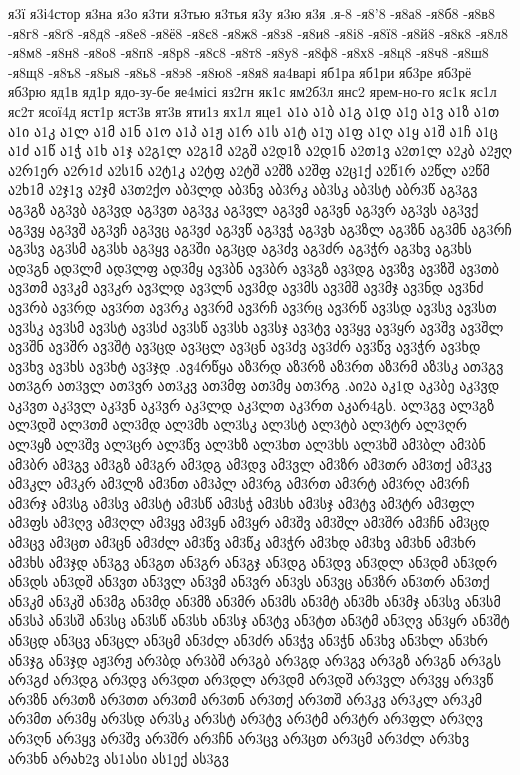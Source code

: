 {{я3ї
я3і4стор
я3на
я3о
я3ти
я3тью
я3тья
я3у
я3ю
я3я
.я-8
-я8'8
-я8а8
-я8б8
-я8в8
-я8г8
-я8ґ8
-я8д8
-я8е8
-я8ё8
-я8є8
-я8ж8
-я8з8
-я8и8
-я8і8
-я8ї8
-я8й8
-я8к8
-я8л8
-я8м8
-я8н8
-я8о8
-я8п8
-я8р8
-я8с8
-я8т8
-я8у8
-я8ф8
-я8х8
-я8ц8
-я8ч8
-я8ш8
-я8щ8
-я8ъ8
-я8ы8
-я8ь8
-я8э8
-я8ю8
-я8я8
яа4варі
яб1ра
яб1ри
яб3ре
яб3рё
яб3рю
яд1в
яд1р
ядо-зу-бе
яе4місі
яз2гн
як1с
ям2б3л
янс2
ярем-но-го
яс1к
яс1л
яс2т
ясої4д
яст1р
яст3в
ят3в
яти1з
ях1л
яце1
ა1ა
ა1ბ
ა1გ
ა1დ
ა1ე
ა1ვ
ა1ზ
ა1თ
ა1ი
ა1კ
ა1ლ
ა1მ
ა1ნ
ა1ო
ა1პ
ა1ჟ
ა1რ
ა1ს
ა1ტ
ა1უ
ა1ფ
ა1ღ
ა1ყ
ა1შ
ა1ჩ
ა1ც
ა1ძ
ა1წ
ა1ჭ
ა1ხ
ა1ჯ
ა2გ1ლ
ა2გ1მ
ა2გშ
ა2დ1ზ
ა2დ1ნ
ა2თ1ვ
ა2თ1ლ
ა2კბ
ა2ჟღ
ა2რ1ერ
ა2რ1ძ
ა2ს1ნ
ა2ტ1კ
ა2ტფ
ა2ტშ
ა2შზ
ა2შფ
ა2ც1ქ
ა2წ1რ
ა2წლ
ა2წმ
ა2ხ1მ
ა2ჯ1ვ
ა2ჯმ
ა3თ2ქო
აბ3ლდ
აბ3ნვ
აბ3რკ
აბ3სკ
აბ3სტ
აბრ3წ
აგ3გვ
აგ3გზ
აგ3ვბ
აგ3ვდ
აგ3ვთ
აგ3ვკ
აგ3ვლ
აგ3ვმ
აგ3ვნ
აგ3ვრ
აგ3ვს
აგ3ვქ
აგ3ვყ
აგ3ვშ
აგ3ვჩ
აგ3ვც
აგ3ვძ
აგ3ვწ
აგ3ვჭ
აგ3ვხ
აგ3ზლ
აგ3ზნ
აგ3მნ
აგ3რჩ
აგ3სვ
აგ3სმ
აგ3სხ
აგ3ყვ
აგ3ში
აგ3ცდ
აგ3ძვ
აგ3ძრ
აგ3ჭრ
აგ3ხვ
აგ3ხს
ად3გნ
ად3ლმ
ად3ლფ
ად3მყ
ავ3ბნ
ავ3ბრ
ავ3გზ
ავ3დგ
ავ3ზვ
ავ3ზშ
ავ3თბ
ავ3თმ
ავ3კმ
ავ3კრ
ავ3ლდ
ავ3ლნ
ავ3მდ
ავ3მს
ავ3მშ
ავ3მჯ
ავ3ნდ
ავ3ნძ
ავ3რბ
ავ3რდ
ავ3რთ
ავ3რკ
ავ3რმ
ავ3რჩ
ავ3რც
ავ3რწ
ავ3სდ
ავ3სვ
ავ3სთ
ავ3სკ
ავ3სმ
ავ3სტ
ავ3სძ
ავ3სწ
ავ3სხ
ავ3სჯ
ავ3ტვ
ავ3ყვ
ავ3ყრ
ავ3შვ
ავ3შლ
ავ3შნ
ავ3შრ
ავ3შტ
ავ3ცდ
ავ3ცლ
ავ3ცნ
ავ3ძვ
ავ3ძრ
ავ3წვ
ავ3ჭრ
ავ3ხდ
ავ3ხვ
ავ3ხს
ავ3ხტ
ავ3ჯდ
.ავ4რწყა
აზ3რდ
აზ3რზ
აზ3რთ
აზ3რმ
აზ3სკ
ათ3გვ
ათ3გრ
ათ3ვლ
ათ3ვრ
ათ3კვ
ათ3მფ
ათ3მყ
ათ3რგ
.აი2ა
აკ1დ
აკ3ბე
აკ3ვდ
აკ3ვთ
აკ3ვლ
აკ3ვნ
აკ3ვრ
აკ3ლდ
აკ3ლთ
აკ3რთ
აკარ4გს.
ალ3გვ
ალ3გზ
ალ3დშ
ალ3თმ
ალ3მდ
ალ3მხ
ალ3სკ
ალ3სტ
ალ3ტბ
ალ3ტრ
ალ3ღრ
ალ3ყზ
ალ3შვ
ალ3ცრ
ალ3წვ
ალ3ხზ
ალ3ხთ
ალ3ხს
ალ3ხშ
ამ3ბლ
ამ3ბნ
ამ3ბრ
ამ3გვ
ამ3გზ
ამ3გრ
ამ3დგ
ამ3დვ
ამ3ვლ
ამ3ზრ
ამ3თრ
ამ3თქ
ამ3კვ
ამ3კლ
ამ3კრ
ამ3ლზ
ამ3ნთ
ამ3პლ
ამ3რგ
ამ3რთ
ამ3რტ
ამ3რღ
ამ3რჩ
ამ3რჯ
ამ3სგ
ამ3სვ
ამ3სტ
ამ3სწ
ამ3სჭ
ამ3სხ
ამ3სჯ
ამ3ტვ
ამ3ტრ
ამ3ფლ
ამ3ფს
ამ3ღვ
ამ3ღლ
ამ3ყვ
ამ3ყნ
ამ3ყრ
ამ3შვ
ამ3შლ
ამ3შრ
ამ3ჩნ
ამ3ცდ
ამ3ცვ
ამ3ცთ
ამ3ცნ
ამ3ძლ
ამ3წვ
ამ3წკ
ამ3ჭრ
ამ3ხდ
ამ3ხვ
ამ3ხნ
ამ3ხრ
ამ3ხს
ამ3ჯდ
ან3გვ
ან3გთ
ან3გრ
ან3გჯ
ან3დგ
ან3დვ
ან3დლ
ან3დმ
ან3დრ
ან3დს
ან3დშ
ან3ვთ
ან3ვლ
ან3ვმ
ან3ვრ
ან3ვს
ან3ვც
ან3ზრ
ან3თრ
ან3თქ
ან3კმ
ან3კშ
ან3მგ
ან3მდ
ან3მზ
ან3მრ
ან3მს
ან3მტ
ან3მხ
ან3მჯ
ან3სვ
ან3სმ
ან3სპ
ან3სშ
ან3სც
ან3სწ
ან3სხ
ან3სჯ
ან3ტვ
ან3ტთ
ან3ტმ
ან3ღვ
ან3ყრ
ან3შტ
ან3ცდ
ან3ცვ
ან3ცლ
ან3ცმ
ან3ძლ
ან3ძრ
ან3ჭვ
ან3ჭნ
ან3ხვ
ან3ხლ
ან3ხრ
ან3ჯგ
ან3ჯდ
აჟ3რჟ
არ3ბდ
არ3ბშ
არ3გბ
არ3გდ
არ3გვ
არ3გზ
არ3გნ
არ3გს
არ3გძ
არ3დგ
არ3დვ
არ3დთ
არ3დლ
არ3დმ
არ3დშ
არ3ვლ
არ3ვყ
არ3ვწ
არ3ზნ
არ3თზ
არ3თთ
არ3თმ
არ3თნ
არ3თქ
არ3თშ
არ3კვ
არ3კლ
არ3კმ
არ3მთ
არ3მყ
არ3სდ
არ3სკ
არ3სტ
არ3ტვ
არ3ტმ
არ3ტრ
არ3ფლ
არ3ღვ
არ3ღნ
არ3ყვ
არ3შვ
არ3შრ
არ3ჩნ
არ3ცვ
არ3ცთ
არ3ცმ
არ3ძლ
არ3ხვ
არ3ხნ
არახ2ვ
ას1ასი
ას1ექ
ას3გვ
}}
